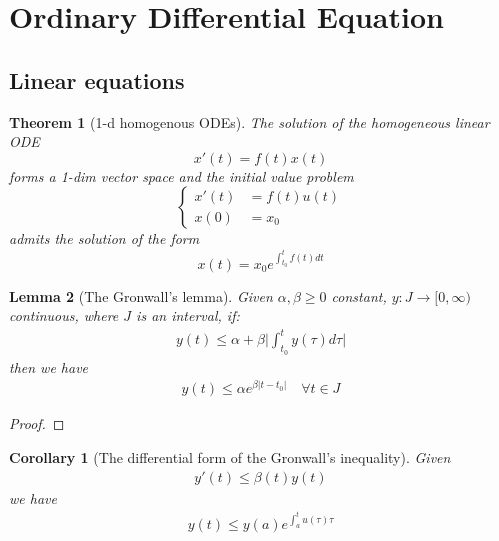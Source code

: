 \documentclass[12pt,fleqn]{book}
\newtheorem{theorem}{Theorem}[section]
\newtheorem{corollary}{Corollary}[theorem]
\newtheorem{lemma}[theorem]{Lemma}
\theoremstyle{definition}
\begin{document}
\section{Ordinary Differential Equation}
\subsection{Linear equations}
\begin{theorem}[1-d homogenous ODEs]
	The solution of the homogeneous linear ODE
	\begin{equation*}
		x'(t) = f(t)x(t)
	\end{equation*}
	forms a 1-dim vector space and the initial value problem
	\begin{equation*}
	\left\{
	\begin{aligned}
		x'(t) &= f(t)u(t)\\
		x(0) &= x_0
	\end{aligned}
	\right.
	\end{equation*}
	admits the solution of the form
	\begin{equation*}
		x(t) = x_0 e^{\int_{t_0}^{t} f(t) dt} 
	\end{equation*}
\end{theorem}

\begin{lemma}[The Gronwall's lemma]
Given $\alpha, \beta \ge 0$ constant, $y: J \rightarrow [0, \infty)$ continuous, where $J$ is an interval, if:
\begin{align*}
	y(t) \le \alpha + \beta \bigg| \int_{t_0}^t y(\tau) d\tau \bigg|
\end{align*}
then we have
\begin{align*}
	y(t) \le \alpha e^{\beta | t - t_0|} \quad \forall t \in J
\end{align*}
\end{lemma}
\begin{proof}
\end{proof}

\begin{corollary}[The differential form of the Gronwall's inequality]
	Given 
	\begin{align*}
		y'(t) \le \beta(t) y(t)
	\end{align*}
	we have
	\begin{align*}
		y(t) \le y(a) e^{\int_a^t u(\tau) \tau}
	\end{align*}
\end{corollary}
\end{document}
